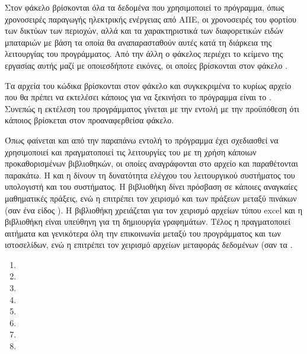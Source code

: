 \documentclass[12pt]{report}
\begin{document}
Στον φάκελο {} βρίσκονται όλα τα δεδομένα που χρησιμοποιεί το πρόγραμμα, όπως χρονοσειρές παραγωγής ηλεκτρικής ενέργειας από ΑΠΕ, οι χρονοσειρές του φορτίου των δικτύων των περιοχών, αλλά και τα χαρακτηριστικά των
διαφορετικών ειδών μπαταριών με βάση τα οποία θα αναπαρασταθούν αυτές κατά τη διάρκεια της λειτουργίας του προγράμματος. Από την άλλη ο φάκελος {} περιέχει το κείμενο της εργασίας αυτής μαζί με οποιεσδήποτε εικόνες, οι
οποίες βρίσκονται στον φάκελο {}.

Τα αρχεία του κώδικα βρίσκονται στον φάκελο {} και συγκεκριμένα το κυρίως αρχείο που θα πρέπει να εκτελέσει κάποιος για να ξεκινήσει το πρόγραμμα είναι το {}. Συνεπώς η εκτέλεση του προγράμματος γίνεται με την εντολή {} με την προϋπόθεση ότι κάποιος βρίσκεται στον προαναφερθείσα φάκελο.

Όπως φαίνεται και από την παραπάνω εντολή το πρόγραμμα έχει σχεδιασθεί να χρησιμοποιεί {} και πραγματοποιεί τις λειτουργίες του με τη χρήση κάποιων προκαθορισμένων βιβλιοθηκών, οι οποίες αναγράφονται στο 
αρχείο {} και παραθέτονται παρακάτω. Η {} και η {} δίνουν τη δυνατότητα ελέγχου του λειτουργικού συστήματος του υπολογιστή και του συστήματος. Η βιβλιοθήκη {}
δίνει πρόσβαση σε κάποιες αναγκαίες μαθηματικές πράξεις, ενώ η {} επιτρέπει τον χειρισμό και των πράξεων μεταξύ πινάκων (σαν ένα είδος {}). Η βιβλιοθήκη {} χρειάζεται για τον
χειρισμό αρχείων τύπου excel και η βιβλιοθήκη {} είναι υπεύθηνη για τη δημιουργία γραφημάτων. Τέλος η {} πραγματοποιεί αιτήματα και γενικότερα όλη την επικοινωνία μεταξύ του προγράμματος
και των ιστοσελίδων, ενώ η {} επιτρέπει τον χειρισμό αρχείων μεταφοράς δεδομένων {} (σαν τα {}.

\begin{multicols}{4}
\begin{enumerate}[label=\roman*.]
				\item {}
				\item {}
				\item {}
				\item {}
				\item {}
				\item {}
				\item {}
				\item {}
\end{enumerate}
\end{multicols}
\end{document}
